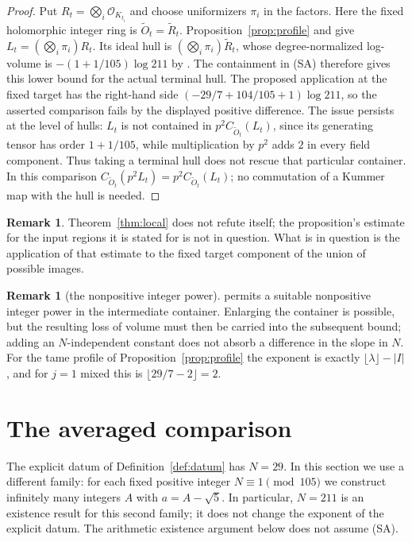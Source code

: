 \documentclass[11pt]{article}
\theoremstyle{plain}
\theoremstyle{definition}
\newtheorem{remark}[theorem]{Remark}
\newcommand{\SA}{\textup{(SA)}}
\begin{document}
\begin{proof}
Put $R_t=\bigotimes_i\mathcal O_{K_{t_i}}$ and choose uniformizers
$\pi_i$ in the factors.  Here the fixed holomorphic integer ring is
$\widetilde O_t=\widetilde R_t$.  Proposition~\ref{prop:profile} and
\cite[Proposition 1.2(i)]{IUT4} give
$L_t=(\bigotimes_i\pi_i)R_t$.  Its ideal hull is
$(\bigotimes_i\pi_i)\widetilde R_t$, whose degree-normalized log-volume
is $-(1+1/105)\log211$ by \cite[Proposition 1.4(i)]{IUT4}.
The containment in \SA{} therefore gives this lower bound for the actual
terminal hull.  The proposed application at the fixed target has the
right-hand side $(-29/7+104/105+1)\log211$, so the asserted comparison
fails by the displayed positive difference.
The issue persists at the level of hulls: $L_t$ is not contained in
$p^2C_{\widetilde O_t}(L_t)$, since its generating tensor has order
$1+1/105$, while multiplication by $p^2$ adds $2$ in every field component.
Thus taking a terminal hull does not rescue that particular container.
In this comparison $C_{\widetilde O_t}(p^2L_t)=p^2C_{\widetilde O_t}(L_t)$;
no commutation of a Kummer map with the hull is needed.
\end{proof}

\begin{remark}
Theorem~\ref{thm:local} does not refute \cite[Proposition 1.4]{IUT4} itself; the
proposition's estimate for the input regions it is stated for is not in question.
What is in question is the application of that estimate to the fixed target
component of the union of possible images.
\end{remark}

\begin{remark}[the nonpositive integer power]
\cite[Theorem 1.10, proof, Step (v)]{IUT4} permits a suitable nonpositive integer power in the
intermediate container.  Enlarging the container is possible, but the resulting
loss of volume must then be carried into the subsequent bound; adding an
$N$-independent constant does not absorb a difference in the slope in $N$.  For
the tame profile of Proposition~\ref{prop:profile} the exponent is exactly
$\lfloor\lambda\rfloor-|I|$, and for $j=1$ mixed this is
$\lfloor29/7-2\rfloor=2$.
\end{remark}

\section{The averaged comparison}\label{sec:averaged}

The explicit datum of Definition~\ref{def:datum} has $N=29$.
In this section we use a different family: for each fixed positive integer
$N\equiv1\pmod{105}$ we construct infinitely many integers $A$ with
$a=A-\sqrt5$.  In particular, $N=211$ is an existence result for this second
family; it does not change the exponent of the explicit datum.
The arithmetic existence argument below does not assume \SA{}.
\end{document}
